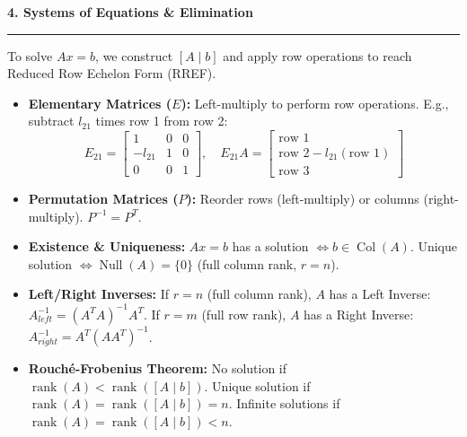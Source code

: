 \documentclass[10pt, landscape, twocolumn]{article}
\newcommand{\cheatsheetsection}[1]{
    \vspace{0.6em}
    {\color{themeblue}\large\bfseries #1} \par
    \vspace{-0.5em}
    {\color{themeblue}\rule{\linewidth}{1pt}} \par
    \vspace{0.2em}
}
\begin{document}
\cheatsheetsection{4. Systems of Equations \& Elimination}
To solve $Ax = b$, we construct $[A \mid b]$ and apply row operations to reach Reduced Row Echelon Form (RREF).
\begin{itemize}[leftmargin=*, itemsep=4pt, parsep=0pt]
    \item \textbf{Elementary Matrices ($E$):} Left-multiply to perform row operations. E.g., subtract $l_{21}$ times row 1 from row 2:
    \[ E_{21} = \begin{bmatrix} 1 & 0 & 0 \\ -l_{21} & 1 & 0 \\ 0 & 0 & 1 \end{bmatrix}, \quad E_{21}A = \begin{bmatrix} \text{row } 1 \\ \text{row } 2 - l_{21}(\text{row } 1) \\ \text{row } 3 \end{bmatrix} \]
    \item \textbf{Permutation Matrices ($P$):} Reorder rows (left-multiply) or columns (right-multiply). $P^{-1} = P^T$.
    \item \textbf{Existence \& Uniqueness:} $Ax=b$ has a solution $\iff b \in \operatorname{Col}(A)$. Unique solution $\iff \operatorname{Null}(A) = \{0\}$ (full column rank, $r=n$).
    \item \textbf{Left/Right Inverses:} If $r=n$ (full column rank), $A$ has a Left Inverse: $A_{left}^{-1} = (A^T A)^{-1}A^T$. If $r=m$ (full row rank), $A$ has a Right Inverse: $A_{right}^{-1} = A^T(AA^T)^{-1}$.
    \item \textbf{Rouché-Frobenius Theorem:} No solution if $\operatorname{rank}(A) < \operatorname{rank}([A \mid b])$. Unique solution if $\operatorname{rank}(A) = \operatorname{rank}([A \mid b]) = n$. Infinite solutions if $\operatorname{rank}(A) = \operatorname{rank}([A \mid b]) < n$.
\end{itemize}
\end{document}
